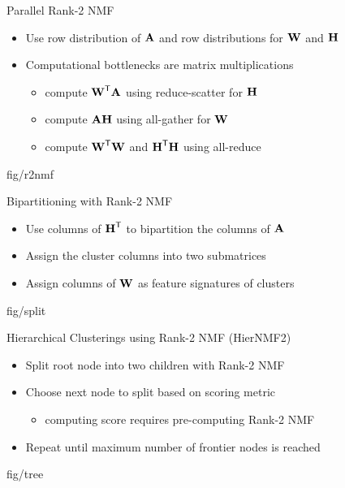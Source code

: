 \documentclass{beamer}
\begin{document}
\begin{frame}{Parallel Rank-2 NMF}
    \begin{itemize}
        \item Use row distribution of $\M{A}$ and row distributions for $\M{W}$ and $\M{H}$ 
        \item Computational bottlenecks are matrix multiplications
        \begin{itemize}
            \item compute $\M{W}^\Tra\M{A}$ using reduce-scatter for $\M{H}$
            \item compute $\M{A}\M{H}$ using all-gather for $\M{W}$
            \item compute $\M{W}^\Tra\M{W}$ and $\M{H}^\Tra\M{H}$ using all-reduce
        \end{itemize}
    \end{itemize}
        {fig/r2nmf}
\end{frame}

\begin{frame}{Bipartitioning with Rank-2 NMF}
    \begin{itemize}
        \item Use columns of $\M{H}^\Tra$ to bipartition the columns of $\M{A}$
        \item Assign the cluster columns into two submatrices
        \item Assign columns of $\M{W}$ as feature signatures of clusters
    \end{itemize}
    \begin{adjustbox}{max totalsize={.7\textwidth}{.6\textheight},center}
        {fig/split}
    \end{adjustbox}
\end{frame}

\begin{frame}{Hierarchical Clusterings using Rank-2 NMF (HierNMF2)}
    \begin{itemize}
        \item Split root node into two children with Rank-2 NMF
        \item Choose next node to split based on scoring metric
        \begin{itemize}
        		\item computing score requires pre-computing Rank-2 NMF
	\end{itemize}
        \item Repeat until maximum number of frontier nodes is reached
    \end{itemize}
    \begin{adjustbox}{max totalsize={.7\textwidth}{.6\textheight},center}
        {fig/tree}
    \end{adjustbox}
\end{frame}
\end{document}
